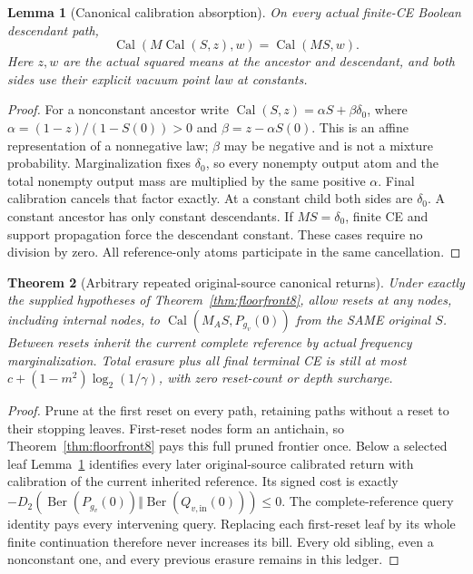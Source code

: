 \documentclass[11pt]{article}
\newtheorem{lemma}{Lemma}
\newtheorem{theorem}[lemma]{Theorem}
\newcommand{\KL}{D_2}
\begin{document}
\begin{lemma}[Canonical calibration absorption]
\label{lem:absorb8}
On every actual finite-CE Boolean descendant path,
\[
\operatorname{Cal}(M\operatorname{Cal}(S,z),w)
=\operatorname{Cal}(MS,w).
\]
Here $z,w$ are the actual squared means at the ancestor and descendant,
and both sides use their explicit vacuum point law at constants.
\end{lemma}
\begin{proof}
For a nonconstant ancestor write
$\operatorname{Cal}(S,z)=\alpha S+\beta\delta_0$, where
$\alpha=(1-z)/(1-S(0))>0$ and $\beta=z-\alpha S(0)$.
This is an affine representation of a nonnegative law; $\beta$ may
be negative and is not a mixture probability. Marginalization fixes
$\delta_0$, so every nonempty output atom and the total nonempty
output mass are multiplied by the same positive $\alpha$.
Final calibration cancels that factor exactly. At a constant child
both sides are $\delta_0$. A constant ancestor has only constant
descendants. If $MS=\delta_0$, finite CE and support propagation force
the descendant constant. These cases require no division by zero.
All reference-only atoms participate in the same cancellation.
\end{proof}

\begin{theorem}[Arbitrary repeated original-source canonical returns]
\label{thm:repeat8}
Under exactly the supplied hypotheses of Theorem~\ref{thm:floorfront8},
allow resets at any nodes, including internal nodes, to
$\operatorname{Cal}(M_AS,P_{g_v}(0))$ from the SAME original $S$.
Between resets inherit the current complete reference by actual
frequency marginalization. Total erasure plus all final terminal CE
is still at most $c+(1-m^2)\log_2(1/\gamma)$, with zero reset-count
or depth surcharge.
\end{theorem}
\begin{proof}
Prune at the first reset on every path, retaining paths without a
reset to their stopping leaves. First-reset nodes form an antichain,
so Theorem~\ref{thm:floorfront8} pays this full pruned frontier once.
Below a selected leaf Lemma~\ref{lem:absorb8} identifies every later
original-source calibrated return with calibration of the current
inherited reference. Its signed cost is exactly
$-\KL(\operatorname{Ber}(P_{g_v}(0))\Vert
\operatorname{Ber}(Q_{v,\mathrm{in}}(0)))\le0$.
The complete-reference query identity pays every intervening query.
Replacing each first-reset leaf by its whole finite continuation
therefore never increases its bill. Every old sibling, even a
nonconstant one, and every previous erasure remains in this ledger.
\end{proof}
\end{document}
